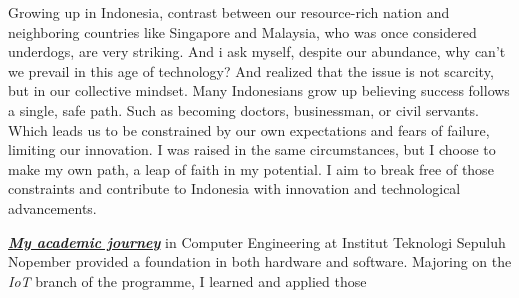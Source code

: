 Growing up in Indonesia, contrast between our resource-rich nation and neighboring countries like Singapore and Malaysia, 
who was once considered underdogs, are very striking. And i ask myself, despite our abundance, why can't we prevail in this
age of technology? And realized that the issue is not scarcity, but in our collective mindset. Many Indonesians grow up believing
success follows a single, safe path. Such as becoming doctors, businessman, or civil servants. Which leads us to be constrained
by our own expectations and fears of failure, limiting our innovation. I was raised in the same circumstances, but I choose to
make my own path, a leap of faith in my potential. I aim to break free of those constraints and contribute to Indonesia with innovation
and technological advancements. 

\underline{\textbf{\textit{My academic journey}}} in Computer Engineering at Institut Teknologi Sepuluh Nopember provided a foundation
in both hardware and software. Majoring on the \textit{IoT} branch of the programme, I learned and applied those 